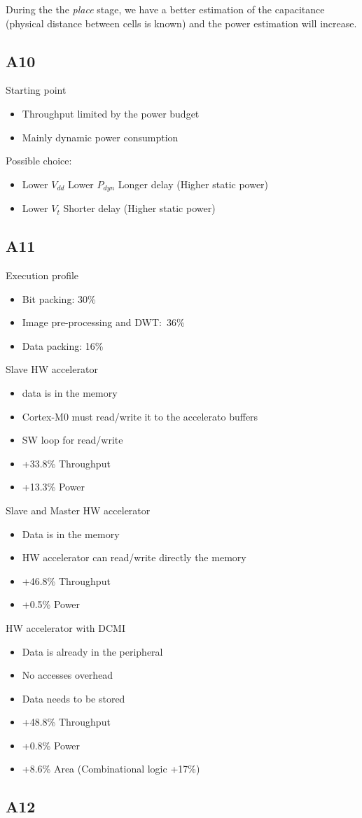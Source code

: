 During the the \textit{place} stage, we have a better estimation of the capacitance (physical distance between cells is known) and the power estimation will increase.
\subsection{A10}
Starting point
\begin{itemize}
  \item Throughput limited by the power budget
  \item Mainly dynamic power consumption
\end{itemize}
\bigbreak
Possible choice:
\begin{itemize}
  \item Lower \(V_{dd}\)
    \subitem Lower \(P_{dyn}\)
    \subitem Longer delay
    \subitem (Higher static power)
  \item Lower \(V_t\)
    \subitem Shorter delay
    \subitem (Higher static power)
\end{itemize}

\subsection{A11}
Execution profile
\begin{itemize}
  \item Bit packing: 30\%
  \item Image pre-processing and DWT: 36\%
  \item Data packing: 16\%
\end{itemize}

Slave HW accelerator
\begin{itemize}
  \item data is in the memory
  \item Cortex-M0 must read/write it to the accelerato buffers
  \item SW loop for read/write
  \item +33.8\% Throughput
  \item +13.3\% Power
\end{itemize}


Slave and Master HW accelerator
\begin{itemize}
  \item Data is in the memory
  \item HW accelerator can read/write directly the memory
  \item +46.8\% Throughput
  \item +0.5\% Power
\end{itemize}


\bigbreak

HW accelerator with DCMI
\begin{itemize}
  \item Data is already in the peripheral
  \item No accesses overhead
  \item Data needs to be stored
  \item +48.8\% Throughput
  \item +0.8\% Power
  \item +8.6\% Area (Combinational logic +17\%)
\end{itemize}


\subsection{A12}

